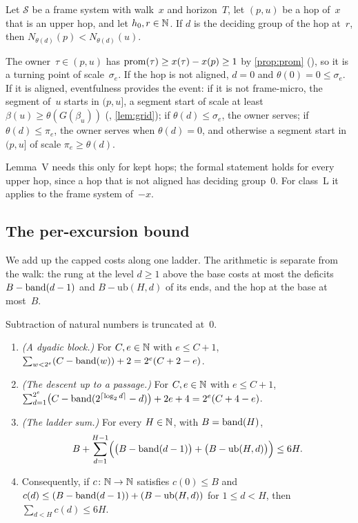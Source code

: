 \begin{lemma}[Validity]\label{lem:validity}
Let $\mathcal S$ be a frame system with walk~$x$ and horizon~$T$, let $(p,u)$ be a hop of~$x$ that is an upper hop, and let
$h_0,r\in\mathbb{N}$. If $d$ is the deciding group of the hop at~$r$, then $N_{\theta(d)}(p)<N_{\theta(d)}(u)$.
\end{lemma}

\begin{outline}
The owner~$\tau\in(p,u)$ has $\operatorname{prom}(\tau)\ge x(\tau)-x(p)\ge1$ by \cref{prop:prom} (), so it is a turning point
of scale~$\sigma_e$. If the hop is not aligned, $d=0$ and $\theta(0)=0\le\sigma_e$. If it is aligned, eventfulness provides the
event: if it is not frame-micro, the segment of~$u$ starts in $(p,u]$, a segment start of scale at least
$\beta(u)\ge\theta(G(\beta_u))$ (, \cref{lem:grid}); if $\theta(d)\le\sigma_e$, the owner serves; if
$\theta(d)\le\pi_e$, the owner serves when $\theta(d)=0$, and otherwise a segment start in $(p,u]$ of scale $\pi_e\ge\theta(d)$.
\end{outline}

Lemma~V needs this only for kept hops; the formal statement holds for every upper hop, since a hop that is not aligned has
deciding group~$0$. For class~L it applies to the frame system of~$-x$.

\subsection{The per-excursion bound}\label{sec:ladders-perexc}

We add up the capped costs along one ladder. The arithmetic is separate from the walk: the rung at the level $d\ge1$ above the
base costs at most the deficits $B-\operatorname{band}(d-1)$ and $B-\mathrm{ub}(H,d)$ of its ends, and the hop at the base at most~$B$.

\begin{lemma}\label{lem:perexc}
Subtraction of natural numbers is truncated at~$0$.
\begin{enumerate}[label=(\alph*)]
\item \emph{(A dyadic block.)} For $C,e\in\mathbb{N}$ with $e\le C+1$, $\sum_{w<2^e}(C-\operatorname{band}(w))+2=2^e(C+2-e)$.
\item \emph{(The descent up to a passage.)} For $C,e\in\mathbb{N}$ with $e\le C+1$,
$\sum_{d=1}^{2^e}\bigl(C-\operatorname{band}(2^{\lceil\log_2d\rceil}-d)\bigr)+2e+4=2^e(C+4-e)$.
\item \emph{(The ladder sum.)} For every $H\in\mathbb{N}$, with $B=\operatorname{band}(H)$,
\[
  B+\sum_{d=1}^{H-1}\Bigl(\bigl(B-\operatorname{band}(d-1)\bigr)+\bigl(B-\mathrm{ub}(H,d)\bigr)\Bigr)\le6H.
\]
\item Consequently, if $c\colon\mathbb{N}\to\mathbb{N}$ satisfies $c(0)\le B$ and $c(d)\le(B-\operatorname{band}(d-1))+(B-\mathrm{ub}(H,d))$ for $1\le
d<H$, then $\sum_{d<H}c(d)\le6H$.
\end{enumerate}
\end{lemma}

